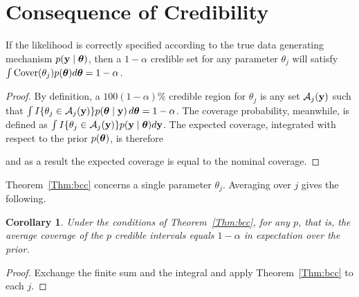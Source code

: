 \section{Consequence of Credibility}\label{sup:thm}

\begin{thm}
  \label{Thm:bcc}
  If the likelihood is correctly specified according to the true data generating mechanism $p(\mathbf{y} \mid \boldsymbol{\theta})$, then a $1-\alpha$ credible set for any parameter $\theta_j$ will satisfy $\int \textrm{Cover}(\theta_j)p(\boldsymbol{\theta}) d\boldsymbol{\theta} = 1 - \alpha$.
\end{thm}

\begin{proof}
  By definition, a $100(1-\alpha)\%$ credible region for $\theta_j$ is any set $\mathcal{A}_j(\mathbf{y})$ such that $\int I\{\theta_j \in \mathcal{A}_j(\mathbf{y})\} p(\boldsymbol{\theta} \mid \mathbf{y})\,d\boldsymbol{\theta} = 1 - \alpha$. The coverage probability, meanwhile, is defined as $\int I\{\theta_j \in \mathcal{A}_j(\mathbf{y})\} p(\mathbf{y} \mid \boldsymbol{\theta})d\mathbf{y}$. The expected coverage, integrated with respect to the prior $p(\boldsymbol{\theta})$, is therefore


  \noindent and as a result the expected coverage is equal to the nominal coverage.
\end{proof}

Theorem~\ref{Thm:bcc} concerns a single parameter $\theta_j$. Averaging over $j$
gives the following.

\newtheorem{corr}{Corollary}
\theoremstyle{remark}
\newtheorem{rem}{Remark}

\begin{corr}
  \label{Cor:ac}
  Under the conditions of Theorem~\ref{Thm:bcc}, for any $p$,
  that is, the average coverage of the $p$ credible intervals equals $1-\alpha$
  in expectation over the prior.
\end{corr}

\begin{proof}
  Exchange the finite sum and the integral and apply Theorem~\ref{Thm:bcc} to each $j$.
\end{proof}


